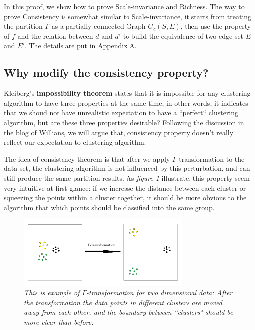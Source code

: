 \documentclass{uonmathreport}
\begin{document}
In this proof, we show how to prove Scale-invariance and Richness. The way to prove Consistency is somewhat similar to Scale-invariance, it starts from treating the partition $\Gamma$ as a partially connected Graph $G_c(S,E)$, then use the property of $f$ and the relation between $d$ and $d'$ to build the equivalence of two edge set $E$ and $E'$. The details are put in Appendix A.


\subsection{Why modify the consistency property?} \label{subsec: motivation for modifying consistency}
Kleiberg's \textbf{impossibility theorem} states that it is impossible for any clustering algorithm to have three properties at the same time, in other words, it indicates that we shoud not have unrealistic expectation to have a ``perfect“ clustering algorithm, but are these three properties desirable? Following the discussion in the blog of Willians\cite{williams_2015}, we will argue that, consistency property doesn't really reflect our expectation to clustering algorithm.

The idea of consistency theorem is that after we apply $\Gamma$-transformation to the data set, the clustering algorithm is not influenced by this perturbation, and can still produce the same partition results. As \textit{figure 1} illustrate, this property seem very intuitive at first glance: if we increase the distance between each cluster or squeezing the points within a cluster together, it should be more obvious to the algorithm that which points should be classified into the same group.
\begin{figure}[H]
 \begin{center}
   \includegraphics[width=0.75\textwidth]{Paper_figure_1.png}
 \end{center}
 \caption{\textit{This is example of $\Gamma$-transformation for two dimensional data: After the transformation the data points in different clusters are moved away from each other, and the boundary between ``clusters" should be more clear than before.}}
 \label{fig:bsd}
\end{figure}
\end{document}
